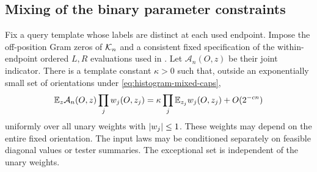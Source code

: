 \subsection{Mixing of the binary parameter constraints}

\begin{lemma}\label{lem:binary-mixing}
Fix a query template whose labels are distinct at each used endpoint.
Impose the off-position Gram zeros of $\mathcal K_n$ and a consistent fixed
specification of the within-endpoint ordered $L,R$ evaluations used
in . Let $\mathcal A_n(O,z)$ be their joint
indicator. There is a template constant $\kappa>0$ such that, outside
an exponentially small set of orientations under
\eqref{eq:histogram-mixed-caps},
\begin{equation}\label{eq:binary-mixing}
 \mathbb E_z\mathcal A_n(O,z)\prod_jw_j(O,z_j)
 =\kappa\prod_j\mathbb E_{z_j}w_j(O,z_j)+O(2^{-c n})
\end{equation}
uniformly over all unary weights with $\lvert w_j\rvert\le1$. These weights
may depend on the entire fixed orientation. The input laws may be
conditioned separately on feasible diagonal values or tester summaries.
The exceptional set is independent of the unary weights.
\end{lemma}

